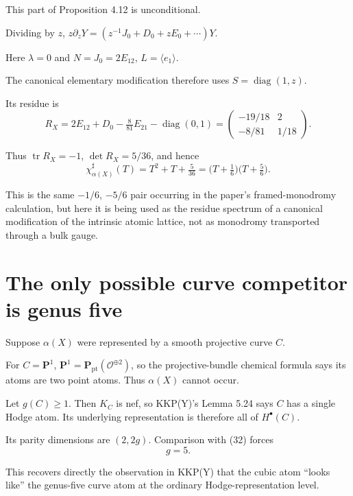 \documentclass[11pt]{article}
\theoremstyle{definition}
\theoremstyle{remark}
\newcommand{\PP}{\mathbf P}
\begin{document}
This part of Proposition 4.12 is unconditional.

Dividing by $z$, $z\partial_zY=(z^{-1}J_0+D_0+zE_0+\cdots)Y$.

Here $\lambda=0$ and $N=J_0=2E_{12}$, $L=\langle e_1\rangle$.

The canonical elementary modification therefore uses
$S=\operatorname{diag}(1,z)$.

Its residue is
\begin{equation}
  R_X=2E_{12}+D_0-\tfrac{8}{81}E_{21}-\operatorname{diag}(0,1)
  =\begin{pmatrix}-19/18&2\\-8/81&1/18\end{pmatrix}.
  \tag{33}
\end{equation}

Thus $\operatorname{tr}R_X=-1$, $\det R_X=5/36$, and hence
\begin{equation}
  \boxed{\ \chi^\sharp_{\alpha(X)}(T)=T^2+T+\tfrac{5}{36}
  =\bigl(T+\tfrac16\bigr)\bigl(T+\tfrac56\bigr).\ }
  \tag{34}
\end{equation}

This is the same $-1/6$, $-5/6$ pair occurring in the paper's framed-monodromy
calculation, but here it is being used as the residue spectrum of a canonical
modification of the intrinsic atomic lattice, not as monodromy transported
through a bulk gauge.

\section{The only possible curve competitor is genus five}

Suppose $\alpha(X)$ were represented by a smooth projective curve $C$.

For $C=\PP^1$, $\PP^1=\PP_{\mathrm{pt}}(\mathcal O^{\oplus2})$, so the
projective-bundle chemical formula says its atoms are two point atoms. Thus
$\alpha(X)$ cannot occur.

Let $g(C)\ge1$. Then $K_C$ is nef, so KKP(Y)'s Lemma 5.24 says $C$ has a single
Hodge atom. Its underlying representation is therefore all of $H^\bullet(C)$.

Its parity dimensions are $(2,2g)$. Comparison with (32) forces
\begin{equation}
  g=5.
  \tag{35}
\end{equation}

This recovers directly the observation in KKP(Y) that the cubic atom ``looks
like'' the genus-five curve atom at the ordinary Hodge-representation level.
\end{document}

